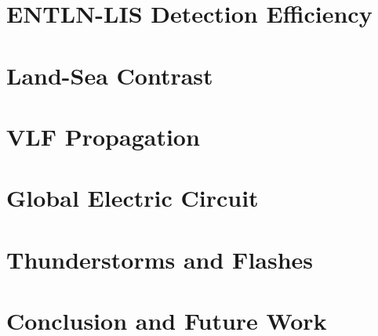 \documentclass [11pt, twoside] {uwthesis}[2012/06/19]
\begin{document}

\chapter{ENTLN-LIS Detection Efficiency}
\label{thesis:chapter:entln-lis}




\chapter{Land-Sea Contrast}
\label{thesis:chapter:landsea}




\chapter{VLF Propagation}
\label{thesis:chapter:prop}





\chapter{Global Electric Circuit}
\label{thesis:chapter:gec}




\chapter{Thunderstorms and Flashes}
\label{thesis:chapter:thunder}




\chapter{Conclusion and Future Work}
\label{thesis:chapter:conclusion}




%
%



\end{document}

